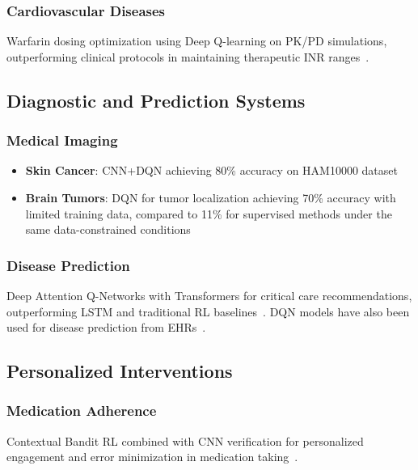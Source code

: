 \documentclass[runningheads]{llncs}
\begin{document}
\subsubsection{Cardiovascular Diseases}
Warfarin dosing optimization using Deep Q-learning on PK/PD simulations, outperforming clinical protocols in maintaining therapeutic INR ranges~\cite{zadehOptimizingWarfarinDosing2023}.

\subsection{Diagnostic and Prediction Systems}

\subsubsection{Medical Imaging}
\begin{itemize}
    \item \textbf{Skin Cancer}: CNN+DQN achieving 80\% accuracy on HAM10000 dataset~\cite{dahdouhNewApproachUsing2023,barataReinforcementLearningModel2023}
    \item \textbf{Brain Tumors}: DQN for tumor localization achieving 70\% accuracy with limited training data, compared to 11\% for supervised methods under the same data-constrained conditions~\cite{stemberReinforcementLearningUsing2022}
\end{itemize}

\subsubsection{Disease Prediction}
Deep Attention Q-Networks with Transformers for critical care recommendations, outperforming LSTM and traditional RL baselines~\cite{maDeepAttentionQnetwork2023}. DQN models have also been used for disease prediction from EHRs~\cite{abdelazizDeepQNetworkDQN2025}.

\subsection{Personalized Interventions}

\subsubsection{Medication Adherence}
Contextual Bandit RL combined with CNN verification for personalized engagement and error minimization in medication taking~\cite{ismailAdvancingPatientCare2024}.
\end{document}
